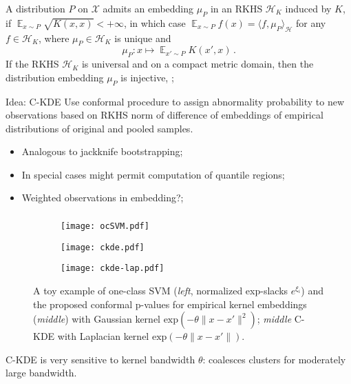 \documentclass[t]{beamer}  %
\newcommand{\Xcal}{\mathcal{X}}
\newcommand{\Hcal}{\mathcal{H}}
\newcommand{\ex}{\mathop{\mathbb{E}}\nolimits}
\begin{document}
\begin{frame}[c]\frametitle{\insertsection}
  \framesubtitle{\insertsubsection}
  A distribution $P$ on $\Xcal$ admits an embedding $\mu_P$ in an RKHS $\Hcal_K$
  induced by $K$, if $\ex_{x\sim P} \sqrt{K(x,x)} < +\infty$, in which case
  $\ex_{x\sim P} f(x) = \langle f, \mu_P \rangle_\Hcal $ for any $f\in \Hcal_K$,
  where $\mu_P\in \Hcal_K$ is unique and
  $$ \mu_P: x \mapsto \ex_{x'\sim P} K(x', x) \,. $$
  If the RKHS $\Hcal_K$ is universal and on a compact metric domain, then the
  distribution embedding $\mu_P$ is injective, \cite{gretton2012};

  \begin{block}{Idea: C-KDE}
    Use conformal procedure to assign abnormality probability to new observations
    based on RKHS norm of difference of embeddings of empirical distributions of
    original and pooled samples.
    \begin{itemize}
      \item Analogous to jackknife bootstrapping;
      \item In special cases might permit computation of quantile regions;
      \item Weighted observations in embedding?;
    \end{itemize}
  \end{block}
\end{frame}

\begin{frame}[c, shrink=0]\frametitle{\insertsection}
  \framesubtitle{\insertsubsection}
  \begin{figure}%
    \centering
    \begin{subfigure}[b]{0.33\linewidth}
      \texttt{[image: ocSVM.pdf]}
    \end{subfigure}%
    \begin{subfigure}[b]{0.33\linewidth}
      \texttt{[image: ckde.pdf]}
    \end{subfigure}%
    \begin{subfigure}[b]{0.33\linewidth}
      \texttt{[image: ckde-lap.pdf]}
    \end{subfigure}%
    \caption{A toy example of one-class SVM (\textit{left}, normalized exp-slacks
    $e^{\xi_i}$) and the proposed conformal p-values for empirical kernel embeddings
    (\textit{middle}) with Gaussian kernel $\text{exp}(-\theta\|x-x'\|^2)$;
    \textit{middle} C-KDE with Laplacian kernel $\text{exp}(-\theta\|x-x'\|)$.}
    \label{fig:gauss_1d_prof_gpr}
  \end{figure}
  C-KDE is very sensitive to kernel bandwidth $\theta$: coalesces clusters for
  moderately large bandwidth.
\end{frame}
\end{document}
